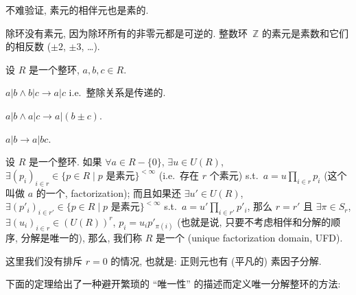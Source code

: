 \documentclass[openany, a5paper, oneside]{ctexbook}
\begin{document}
不难验证, 素元的相伴元也是素的.

除环没有素元, 因为除环所有的非零元都是可逆的. 整数环~$\mathbb Z$ 的素元是素数和它们的相反数 ($\pm 2$, $\pm 3$, \ldots). 

\begin{theorem}[整除的性质]
	设 $R$ 是一个整环, $a, b, c \in R$.
	\begin{conditionlist}
		\item $a | b \wedge b | c \to a | c$ i.e.\ 整除关系是传递的.
		\item $a | b \wedge a | c \to a | (b \pm c)$.
		\item $a | b \to a | bc$.
	\end{conditionlist}
\end{theorem}

\begin{definition}[唯一分解整环]
	设 $R$ 是一个整环.
	如果 $\forall a \in R - \{0\}$, $\exists u \in U(R)$, $\exists (p_i)_{i \in r} \in \{p \in R \mid \text{$p$ 是素元}\}^{< \infty}$ (i.e.\ 存在 $r$ 个素元) s.t.\ $a = u \prod_{i \in r} p_i$ (这个叫做 $a$ 的一个, factorization);
	而且如果还 $\exists u' \in U(R)$, $\exists (p'_i)_{i \in r'} \in \{p \in R \mid \text{$p$ 是素元}\}^{< \infty}$ s.t.\ $a = u' \prod_{i \in r'} p'_i$, 
	那么 $r = r'$ 且 $\exists \pi \in S_r$, $\exists (u_i)_{i \in r} \in (U(R))^r$, $p_i = u_i p'_{\pi(i)}$ (也就是说, 只要不考虑相伴和分解的顺序, 分解是唯一的), 
	那么, 我们称 $R$ 是一个 (unique factorization domain, UFD).
\end{definition}

这里我们没有排斥 $r = 0$ 的情况, 也就是: 正则元也有 (平凡的) 素因子分解.

下面的定理给出了一种避开繁琐的 ``唯一性'' 的描述而定义唯一分解整环的方法:
\end{document}
